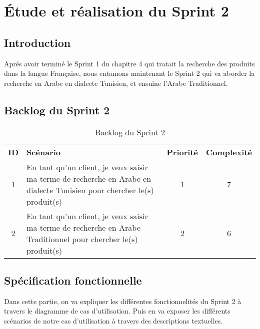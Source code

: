 \chapter{Étude et réalisation du Sprint 2}
\section{Introduction}
\noindent
Aprés avoir terminé le Sprint 1 du chapitre 4 qui tratait la recherche des produits dans la langue Française, nous entamons maintenant le Sprint 2 qui va aborder la recherche en Arabe en dialecte Tunisien, et ensuine l'Arabe Traditionnel.

\section{Backlog du Sprint 2}
\begin{table}[H]
	\centering

	\begin{tabularx}{\textwidth}{|c|X|c|c|}
		\hline
		\rowcolor{blue!20}
		\textbf{ID} & \textbf{Scénario}                                                                                     & \textbf{Priorité} & \textbf{Complexité} \\ \hline
		1           & En tant qu'un client, je veux saisir ma terme de recherche en Arabe en dialecte Tunisien pour chercher le(s) produit(s) & 1                 & 7                  \\ \hline

	2           & En tant qu'un client, je veux saisir ma terme de recherche en Arabe Traditionnel pour chercher le(s) produit(s) & 2                 & 6 \\ \hline
	\end{tabularx}
	\caption{Backlog du Sprint 2}
	\label{tab:sprint2}
\end{table}

\section{Spécification fonctionnelle}
\noindent
Dans cette partie, on va expliquer les différentes fonctionnelités du Sprint 2 à travers le diagramme de cas d'utilisation. Puis en va exposer les différents scénarios de notre cas d'utilisation à travers des descriptions textuelles.



